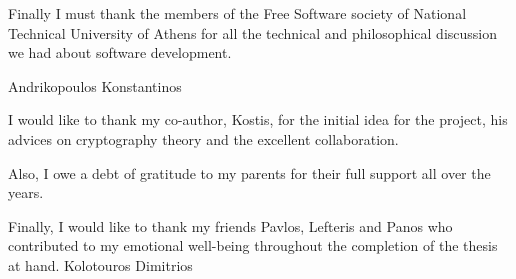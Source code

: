 \documentclass[
11pt, %
english, %
singlespacing, %
parskip, %
headsepline, %
]{MastersDoctoralThesis} %
\begin{document}
\begin{acknowledgements}
Finally I must thank the members of the Free Software society of National Technical University of Athens for all the technical and philosophical discussion we had about software development.

\bigbreak
\hfill Andrikopoulos Konstantinos

I would like to thank my co-author, Kostis, for the initial idea for the project, his advices on cryptography theory and the excellent collaboration.

Also, I owe a debt of gratitude to my parents for their full support all over the years.

Finally, I would like to thank my friends Pavlos, Lefteris and Panos who contributed to my emotional well-being throughout the completion of the thesis at hand.
\bigbreak
\hfill Kolotouros Dimitrios


\end{acknowledgements}


\tableofcontents %

\listofalgorithms

\lstlistoflistings

\listoffigures %


\end{document}
